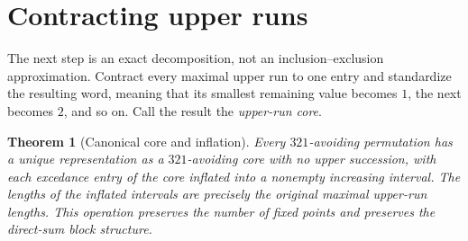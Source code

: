 \documentclass[11pt,letterpaper]{article}
\numberwithin{equation}{section}
\newtheorem{theorem}{Theorem}[section]
\theoremstyle{definition}
\begin{document}
\section{Contracting upper runs}
\label{sec:core}

The next step is an exact decomposition, not an inclusion--exclusion
approximation. Contract every maximal upper run to one entry and
standardize the resulting word, meaning that its smallest remaining
value becomes $1$, the next becomes $2$, and so on. Call the result the
\emph{upper-run core}.

\begin{theorem}[Canonical core and inflation]
\label{thm:core}
Every $321$-avoiding permutation has a unique representation as a
$321$-avoiding core with no upper succession, with each excedance entry
of the core inflated into a nonempty increasing interval. The lengths
of the inflated intervals are precisely the original maximal upper-run
lengths. This operation preserves the number of fixed points and
preserves the direct-sum block structure.
\end{theorem}
\end{document}
